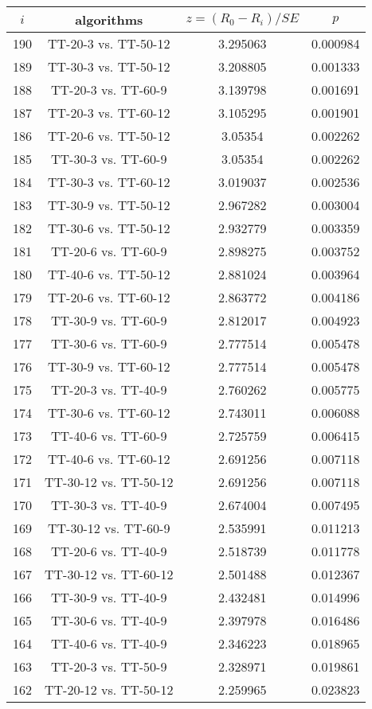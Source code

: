 \documentclass[a4paper,10pt]{article}
\begin{document}
\begin{landscape}
\begin{table}[!htp]
\centering\scriptsize
\begin{tabular}{cccc}
$i$&algorithms&$z=(R_0 - R_i)/SE$&$p$\\
\hline190&TT-20-3 vs. TT-50-12&3.295063&0.000984\\
189&TT-30-3 vs. TT-50-12&3.208805&0.001333\\
188&TT-20-3 vs. TT-60-9&3.139798&0.001691\\
187&TT-20-3 vs. TT-60-12&3.105295&0.001901\\
186&TT-20-6 vs. TT-50-12&3.05354&0.002262\\
185&TT-30-3 vs. TT-60-9&3.05354&0.002262\\
184&TT-30-3 vs. TT-60-12&3.019037&0.002536\\
183&TT-30-9 vs. TT-50-12&2.967282&0.003004\\
182&TT-30-6 vs. TT-50-12&2.932779&0.003359\\
181&TT-20-6 vs. TT-60-9&2.898275&0.003752\\
180&TT-40-6 vs. TT-50-12&2.881024&0.003964\\
179&TT-20-6 vs. TT-60-12&2.863772&0.004186\\
178&TT-30-9 vs. TT-60-9&2.812017&0.004923\\
177&TT-30-6 vs. TT-60-9&2.777514&0.005478\\
176&TT-30-9 vs. TT-60-12&2.777514&0.005478\\
175&TT-20-3 vs. TT-40-9&2.760262&0.005775\\
174&TT-30-6 vs. TT-60-12&2.743011&0.006088\\
173&TT-40-6 vs. TT-60-9&2.725759&0.006415\\
172&TT-40-6 vs. TT-60-12&2.691256&0.007118\\
171&TT-30-12 vs. TT-50-12&2.691256&0.007118\\
170&TT-30-3 vs. TT-40-9&2.674004&0.007495\\
169&TT-30-12 vs. TT-60-9&2.535991&0.011213\\
168&TT-20-6 vs. TT-40-9&2.518739&0.011778\\
167&TT-30-12 vs. TT-60-12&2.501488&0.012367\\
166&TT-30-9 vs. TT-40-9&2.432481&0.014996\\
165&TT-30-6 vs. TT-40-9&2.397978&0.016486\\
164&TT-40-6 vs. TT-40-9&2.346223&0.018965\\
163&TT-20-3 vs. TT-50-9&2.328971&0.019861\\
162&TT-20-12 vs. TT-50-12&2.259965&0.023823\\

\end{tabular}
\end{table}
\end{landscape}
\end{document}
